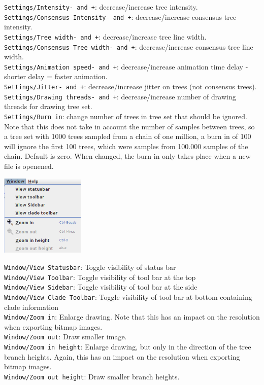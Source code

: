 \documentclass{article}
\begin{document}
\noindent
{\tt Settings/Intensity- and +}: decrease/increase tree intensity.\\
{\tt Settings/Consensus Intensity- and +}: decrease/increase consensus tree intensity.\\
{\tt Settings/Tree width- and +}: decrease/increase tree line width.\\
{\tt Settings/Consensus Tree width- and +}: decrease/increase consensus tree line width.\\
{\tt Settings/Animation speed- and +}: decrease/increase animation time delay - shorter delay = faster animation.\\
{\tt Settings/Jitter- and +}: decrease/increase jitter on trees (not consensus trees).\\
{\tt Settings/Drawing threads- and +}: decrease/increase number of drawing threads for drawing tree set.\\
{\tt Settings/Burn in}: change number of trees in tree set that should be ignored. Note that this does
not take in account the number of samples between trees, so a tree set with 1000 trees sampled from
a chain of one million, a burn in of 100 will ignore the first 100 trees, which were samples from
100.000 samples of the chain. Default is zero. When changed, the burn in only takes place when a new
file is openened.\\
\fi



\begin{center}
\includegraphics[width=4cm]{menuwindow.png}
\end{center}

\noindent
{\tt Window/View Statusbar}: Toggle visibility of status bar\\
{\tt Window/View Toolbar}: Toggle visibility of tool bar at the top\\
{\tt Window/View Sidebar}: Toggle visibility of tool bar at the side\\
{\tt Window/View Clade Toolbar}: Toggle visibility of tool bar at bottom containing clade information\\
{\tt Window/Zoom in}: Enlarge drawing. Note that this has an impact on the resolution when
exporting bitmap images.\\
{\tt Window/Zoom out}: Draw smaller image.\\
{\tt Window/Zoom in height}: Enlarge drawing, but only in the direction of the tree branch heights. 
Again, this has an impact on the resolution when exporting bitmap images.\\
{\tt Window/Zoom out height}: Draw smaller branch heights.\\
\end{document}

